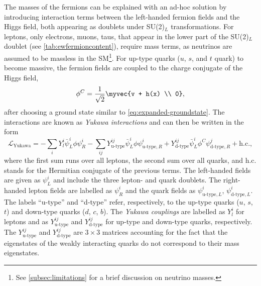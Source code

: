 The masses of the fermions can be explained with an ad-hoc solution by introducing interaction terms between the left-handed fermion fields and the Higgs field, both appearing as doublets under SU(2)$_L$ transformations.
For leptons, only electrons, muons, taus, that appear in the lower part of the SU(2)$_L$ doublet (see \cref{tab:ewfermioncontent}), require mass terms, as neutrinos are assumed to be massless in the SM\footnote{See \cref{subsec:limitations} for a brief discussion on neutrino masses.}.
For up-type quarks ($u$, $s$, and $t$ quark) to become massive, the fermion fields are coupled to the charge conjugate of the Higgs field,
\begin{equation}
  \phi^C = \frac{1}{\sqrt{2}} \myvec{v + h(x) \\ 0},
\end{equation}
after choosing a ground state similar to \cref{eq:expanded-groundstate}.
The interactions are known as \emph{Yukawa interactions} and can then be written in the form
\begin{equation}
  \mathcal{L}_\text{Yukawa} = - \sum_{i} Y_l^i \bar{\psi}^{i}_{L} \phi \psi^{i}_{R} - \sum_{ij} Y_{\text{u-type}}^{ij} \bar{\psi}^{i}_{L} \phi \psi^{i}_{\text{u-type},R} + Y_{\text{d-type}}^{ij} \bar{\psi}^{i}_{L} \phi^C \psi^{j}_{\text{d-type}, R} + \text{h.c.}, 
  \label{eq:lyukawa}
\end{equation}
where the first sum runs over all leptons, the second sum over all quarks, and h.c. stands for the Hermitian conjugate of the previous terms.
The left-handed fields are given as $\psi^{i}_{L}$ and include the three lepton- and quark doublets. 
The right-handed lepton fields are labelled as $\psi_R^i$ and the quark fields as $\psi^{i}_{\text{u-type},L}$, $\psi^{i}_{\text{d-type},L}$.
The labels ``u-type'' and ``d-type'' refer, respectively, to the up-type quarks ($u$, $s$, $t$) and down-type quarks ($d$, $c$, $b$). 
The \emph{Yukawa couplings} are labelled as $Y_l^i$ for leptons and as $Y_{\text{u-type}}^{ij}$ and $Y_{\text{d-type}}^{ij}$ for up-type and down-type quarks, respectively. The $Y_{\text{u-type}}^{ij}$ and $Y_{\text{d-type}}^{ij}$ are $3 \times 3$ matrices accounting for the fact that the eigenstates of the weakly interacting quarks do not correspond to their mass eigenstates. 
